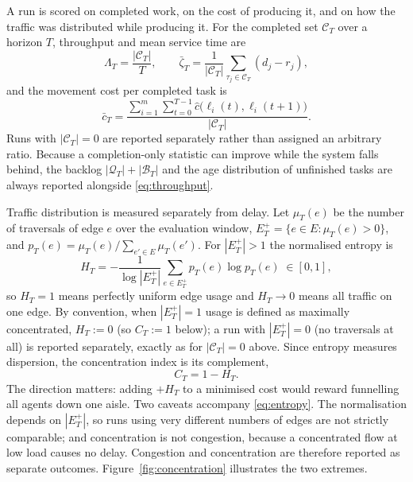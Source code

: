\documentclass[../main.tex]{subfiles}
\begin{document}
A run is scored on completed work, on the cost of producing it, and on how the
traffic was distributed while producing it. For the completed set $\mathcal{C}_T$
over a horizon $T$, throughput and mean service time are
\begin{equation}
  \Lambda_T = \frac{|\mathcal{C}_T|}{T}, \qquad
  \bar{\zeta}_T = \frac{1}{|\mathcal{C}_T|}
                  \sum_{\tau_j \in \mathcal{C}_T} (d_j - r_j),
  \label{eq:throughput}
\end{equation}
and the movement cost per completed task is
\begin{equation}
  \bar{c}_T = \frac{\sum_{i=1}^{m} \sum_{t=0}^{T-1}
                    \hat{c}\bigl(\ell_i(t), \ell_i(t+1)\bigr)}
                   {|\mathcal{C}_T|} .
  \label{eq:movementcost}
\end{equation}
Runs with $|\mathcal{C}_T| = 0$ are reported separately rather than assigned an
arbitrary ratio. Because a completion-only statistic can improve while the system
falls behind, the backlog $|\mathcal{Q}_T| + |\mathcal{B}_T|$ and the age
distribution of unfinished tasks are always reported alongside
\eqref{eq:throughput}.

Traffic distribution is measured separately from delay. Let $\mu_T(e)$ be the
number of traversals of edge $e$ over the evaluation window,
$E^{+}_T = \{e \in E : \mu_T(e) > 0\}$, and
$p_T(e) = \mu_T(e) / \sum_{e' \in E} \mu_T(e')$. For $|E^{+}_T| > 1$ the
normalised entropy is
\begin{equation}
  H_T = -\frac{1}{\log |E^{+}_T|} \sum_{e \in E^{+}_T} p_T(e) \log p_T(e)
        \;\in [0,1],
  \label{eq:entropy}
\end{equation}
so $H_T = 1$ means perfectly uniform edge usage and $H_T \to 0$ means all traffic
on one edge. By convention, when $|E^{+}_T| = 1$ usage is defined as maximally %
concentrated, $H_T := 0$ (so $C_T := 1$ below); a run with $|E^{+}_T| = 0$ (no
traversals at all) is reported separately, exactly as for $|\mathcal{C}_T| = 0$
above. Since entropy measures dispersion, the concentration index is its
complement,
\begin{equation}
  C_T = 1 - H_T .
  \label{eq:concentration}
\end{equation}
The direction matters: adding $+H_T$ to a minimised cost would reward funnelling
all agents down one aisle. Two caveats accompany \eqref{eq:entropy}. The
normalisation depends on $|E^{+}_T|$, so runs using very different numbers of
edges are not strictly comparable; and concentration is not congestion, because a
concentrated flow at low load causes no delay. Congestion and concentration are
therefore reported as separate outcomes.
Figure~\ref{fig:concentration} illustrates the two extremes.
\end{document}
